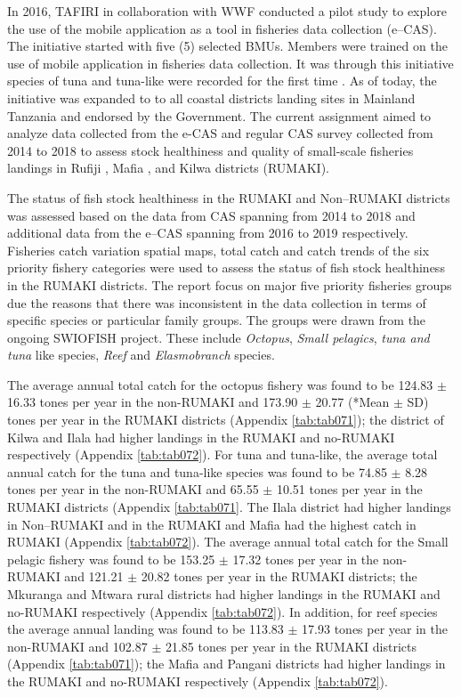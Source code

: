 \documentclass[
  12pt,
  a4paper,
  oneside]{book}
\begin{document}
In 2016, TAFIRI in collaboration with WWF conducted a pilot study to explore the use of the mobile application as a tool in fisheries data collection (e--CAS). The initiative started with five (5) selected BMUs. Members were trained on the use of mobile application in fisheries data collection. It was through this initiative species of tuna and tuna-like were recorded for the first time \citep{kuguru}. As of today, the initiative was expanded to to all coastal districts landing sites in Mainland Tanzania and endorsed by the Government. The current assignment aimed to analyze data collected from the e-CAS and regular CAS survey collected from 2014 to 2018 to assess stock healthiness and quality of small-scale fisheries landings in Rufiji , Mafia , and Kilwa  districts (RUMAKI). 

The status of fish stock healthiness in the RUMAKI and Non--RUMAKI districts was assessed based on the data from CAS spanning from 2014 to 2018 and additional data from the e--CAS  spanning from 2016 to 2019 respectively. Fisheries catch variation spatial maps, total catch and catch trends of the six priority fishery categories were used to assess the status of fish stock healthiness in the RUMAKI districts. The report focus on major five priority fisheries groups due the reasons that there was inconsistent in the data collection in terms of specific species or particular family groups. The groups were drawn from the ongoing SWIOFISH project. These include \emph{Octopus}, \emph{Small pelagics}, \emph{tuna and tuna} like species, \emph{Reef}  and \emph{Elasmobranch} species.

The average annual total catch for the octopus fishery was found to be 124.83 \(\pm\) 16.33 tones per year in the non-RUMAKI and 173.90 \(\pm\) 20.77 (*Mean \(\pm\) SD) tones per year in the RUMAKI districts (Appendix \ref{tab:tab071}); the district of Kilwa and Ilala had higher landings in the RUMAKI and no-RUMAKI respectively (Appendix \ref{tab:tab072}). For tuna and tuna-like, the average total annual catch for the tuna and tuna-like species was found to be 74.85 \(\pm\) 8.28 tones per year in the non-RUMAKI and 65.55 \(\pm\) 10.51 tones per year in the RUMAKI districts (Appendix \ref{tab:tab071}. The Ilala district had higher landings in Non--RUMAKI and in the RUMAKI and Mafia had the highest catch in RUMAKI (Appendix \ref{tab:tab072}). The average annual total catch for the Small pelagic fishery was found to be 153.25 \(\pm\) 17.32 tones per year in the non-RUMAKI and 121.21 \(\pm\) 20.82 tones per year in the RUMAKI districts; the Mkuranga and Mtwara rural districts had higher landings in the RUMAKI and no-RUMAKI respectively (Appendix \ref{tab:tab072}). In addition, for reef species the average annual landing was found to be 113.83 \(\pm\) 17.93 tones per year in the non-RUMAKI and 102.87 \(\pm\) 21.85 tones per year in the RUMAKI districts (Appendix \ref{tab:tab071}); the Mafia and Pangani districts had higher landings in the RUMAKI and no-RUMAKI respectively (Appendix \ref{tab:tab072}).
\end{document}
